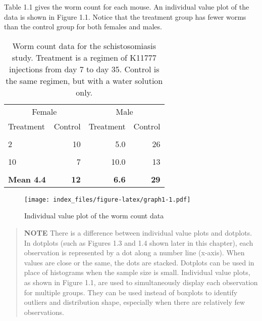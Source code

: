 \documentclass[
]{report}
\theoremstyle{definition}
\theoremstyle{definition}
\theoremstyle{definition}
\theoremstyle{definition}
\theoremstyle{remark}
\begin{document}
Table 1.1 gives the worm count for each mouse. An individual value plot of the data is shown in Figure 1.1. Notice that the treatment group has fewer worms than the control group for both females and males.

\begin{table}[!h]
\centering
\caption{\label{tab:table1}Worm count data for the schistosomiasis study. Treatment is a regimen of K11777 injections from day 7 to day 35. Control is the same regimen, but with a water solution only.}
\centering
\fontsize{10}{12}\selectfont
\begin{tabular}[t]{lrrr}
\toprule
\multicolumn{2}{c}{Female} & \multicolumn{2}{c}{Male} \\
\cmidrule(l{3pt}r{3pt}){1-2} \cmidrule(l{3pt}r{3pt}){3-4}
Treatment & Control & Treatment & Control\\
\midrule
\cellcolor{gray!10}{1} & \cellcolor{gray!10}{16} & \cellcolor{gray!10}{3.0} & \cellcolor{gray!10}{31}\\
2 & 10 & 5.0 & 26\\
\cellcolor{gray!10}{2} & \cellcolor{gray!10}{10} & \cellcolor{gray!10}{9.0} & \cellcolor{gray!10}{28}\\
10 & 7 & 10.0 & 13\\
\cellcolor{gray!10}{7} & \cellcolor{gray!10}{17} & \cellcolor{gray!10}{6.0} & \cellcolor{gray!10}{47}\\
\addlinespace
\textbf{Mean 4.4} & \textbf{12} & \textbf{6.6} & \textbf{29}\\
\bottomrule
\end{tabular}
\end{table}

\begin{figure}
\centering
\texttt{[image: index\_files/figure-latex/graph1-1.pdf]}
\caption{\label{fig:graph1}Individual value plot of the worm count data}
\end{figure}

\newpage

\begin{quote}
\textbf{NOTE}
There is a difference between individual value plots and dotplots. In dotplots (such as Figures 1.3 and
1.4 shown later in this chapter), each observation is represented by a dot along a number line (x-axis).
When values are close or the same, the dots are stacked. Dotplots can be used in place of histograms
when the sample size is small. Individual value plots, as shown in Figure 1.1, are used to simultaneously
display each observation for multiple groups. They can be used instead of boxplots to identify outliers and distribution shape, especially when there are relatively few observations.
\end{quote}
\end{document}
